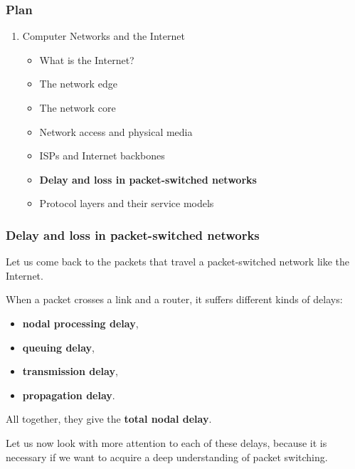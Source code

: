 
%
\begin{frame}
\frametitle{Plan}

\begin{enumerate}

  \item Computer Networks and the Internet

    \begin{itemize}

      \item What is the Internet?

      \item The network edge

      \item The network core

      \item Network access and physical media

      \item ISPs and Internet backbones

      \item \textbf{Delay and loss in packet-switched networks}
 
      \item Protocol layers and their service models

    \end{itemize}

\end{enumerate}

\end{frame}

%
\begin{frame}
\frametitle{Delay and loss in packet-switched networks}

Let us come back to the packets that travel a packet-switched network
like the Internet.

\bigskip

When a packet crosses a link and a router, it suffers different kinds
of delays: 
\begin{itemize}

  \item \textbf{nodal processing delay}, 

  \item \textbf{queuing delay},

  \item \textbf{transmission delay},
 
  \item \textbf{propagation delay}. 

\end{itemize}
All together, they give the \textbf{total nodal delay}.

\bigskip

Let us now look with more attention to each of these delays, because
it is necessary if we want to acquire a deep understanding of packet
switching.

\end{frame}

